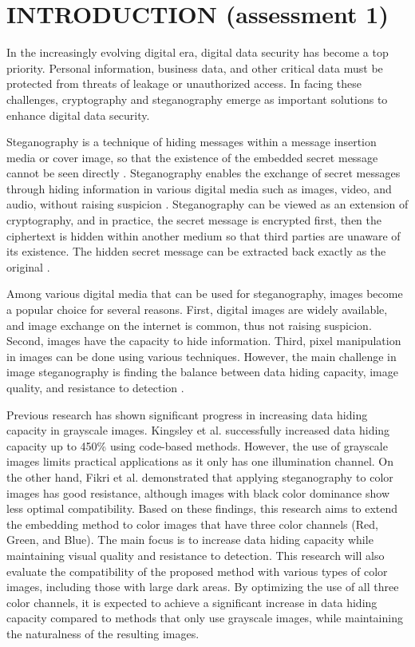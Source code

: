 \documentclass{ittelkom}
\begin{document}
\section{INTRODUCTION \color{red} (assessment 1)}
In the increasingly evolving digital era, digital data security has become a top
priority. Personal information, business data, and other critical data must be
protected from threats of leakage or unauthorized access. In facing these
challenges, cryptography and steganography emerge as important solutions to
enhance digital data security.

Steganography is a technique of hiding messages within a message insertion
media or cover image, so that the existence of the embedded secret message
cannot be seen directly \cite{pujianto2021uji}. Steganography enables the
exchange of secret messages through hiding information in various digital media
such as images, video, and audio, without raising suspicion
\cite{siaulhak2023sistem}. Steganography can be viewed as an extension of
cryptography, and in practice, the secret message is encrypted first, then the
ciphertext is hidden within another medium so that third parties are unaware of
its existence. The hidden secret message can be extracted back exactly as the
original \cite{soetarmono2012studi}.

Among various digital media that can be used for steganography, images become a
popular choice for several reasons. First, digital images are widely available,
and image exchange on the internet is common, thus not raising suspicion.
Second, images have the capacity to hide information. Third, pixel manipulation
in images can be done using various techniques. However, the main challenge in
image steganography is finding the balance between data hiding capacity, image
quality, and resistance to detection \cite{fikri2022optimasi}.

Previous research has shown significant progress in increasing data hiding
capacity in grayscale images. Kingsley et al. \cite{kingsley2020improving}
successfully increased data hiding capacity up to 450\% using code-based
methods. However, the use of grayscale images limits practical applications as
it only has one illumination channel. On the other hand, Fikri et al.
\cite{fikri2022optimasi} demonstrated that applying steganography to color
images has good resistance, although images with black color dominance show
less optimal compatibility. Based on these findings, this research aims to
extend the embedding method to color images that have three color channels
(Red, Green, and Blue). The main focus is to increase data hiding capacity
while maintaining visual quality and resistance to detection. This research
will also evaluate the compatibility of the proposed method with various types
of color images, including those with large dark areas. By optimizing the use
of all three color channels, it is expected to achieve a significant increase
in data hiding capacity compared to methods that only use grayscale images,
while maintaining the naturalness of the resulting images.
\end{document}
